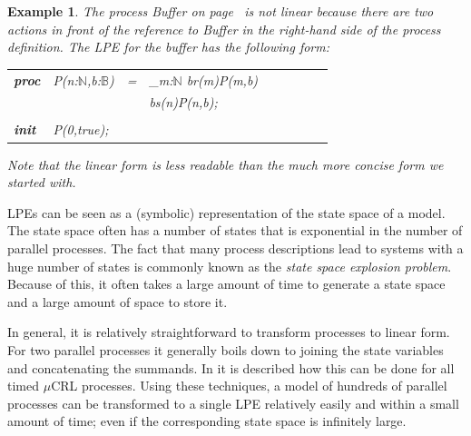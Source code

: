 \documentclass[a4paper,fleqn]{article}
\makeatletter
\newtheorem{thexample}[thdefinition]{Example}
\newenvironment{example}
  {\begin{thexample}\em}
  {\end{thexample}}
\newcommand{\frm}[1]{\mbox{\ensuremath{#1}}}
\newcommand{\bool}{\ensuremath{\mathbb{B}}}
\newcommand{\nat}{\ensuremath{\mathbb{N}}}
\newcommand{\seq}{\mathbin{\cdot}}
\newcommand{\alt}{\mathbin{+}}
\newcommand{\ap}{{:}}
\newcommand{\mCRL}{\frm{\mu}CRL\xspace}
\newenvironment{mcrl2}%
{\par\bigskip\noindent%
 \begin{tabular}{@{}>{\bf}p{2.3em}L@{\ }L@{\ }L@{\ }L@{\ }L@{\ }L@{\ }L@{\ }L}%
}%
{\end{tabular}\bigskip\par%
}
\makeatother
\begin{document}
\begin{example}
The process {\it Buffer} on page~\pageref{spec:buffer} is \emph{not} linear
because there are two actions in front of the reference to {\it Buffer} in the
right-hand side of the process definition. The LPE for the buffer has the
following form:
\begin{mcrl2}
proc & P(n\ap\nat,b\ap\bool) & =  &\sum_{m\ap\nat} b\to r(m){\seq}P(m,\neg b)\\
     &                       &\alt&\neg b\to s(n){\seq}P(n,\neg b);\\
\\
init & P(0,true);
\end{mcrl2}
\noindent
Note that the linear form is less readable than the much more concise form we
started with.
\end{example}
LPEs can be seen as a (symbolic) representation of the state space of a model.
The state space often has a number of states that is exponential in the number
of parallel processes. The fact that many process descriptions lead to systems
with a huge number of states is commonly known as the \emph{state space
explosion problem}. Because of this, it often takes a large amount of time to
generate a state space and a large amount of space to store it.

In general, it is relatively straightforward to transform processes to linear
form. For two parallel processes it generally boils down to joining the state
variables and concatenating the summands. In \cite{Usenko 2002} it is described
how this can be done for all timed \mCRL processes. Using these techniques, a
model of hundreds of parallel processes can be transformed to a single LPE
relatively easily and within a small amount of time; even if the corresponding
state space is infinitely large. 
\end{document}
